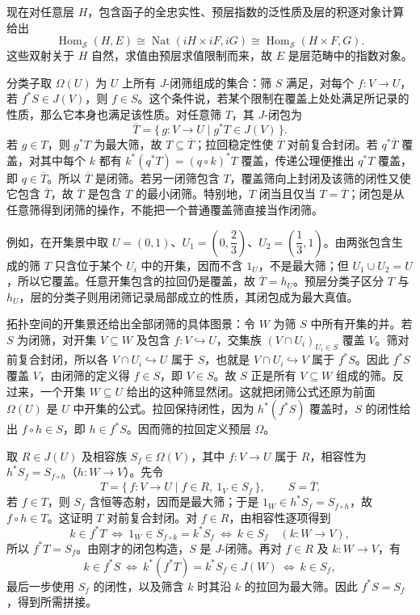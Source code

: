 \begin{proofsketch}
	现在对任意层 \(H\)，包含函子的全忠实性、预层指数的泛性质及层的积逐对象计算给出
	\[
		\operatorname{Hom}_{\mathcal S}(H,E) \cong\operatorname{Nat}(iH\times iF,iG) \cong\operatorname{Hom}_{\mathcal S}(H\times F,G).
	\]
	这些双射关于 \(H\) 自然，求值由预层求值限制而来，故 \(E\) 是层范畴中的指数对象。

	分类子取 \(\Omega(U)\) 为 \(U\) 上所有 \(J\)-闭筛组成的集合：筛 \(S\) 满足，对每个 \(f:V\to U\)，若 \(f^*S\in J(V)\)，则 \(f\in S\)。这个条件说，若某个限制在覆盖上处处满足所记录的性质，那么它本身也满足该性质。对任意筛 \(T\)，其 \(J\)-闭包为
	\[
		\overline T=\{\,g:V\to U\mid g^*T\in J(V)\,\}.
	\]
	若 \(g\in T\)，则 \(g^*T\) 为最大筛，故 \(T\subseteq\overline T\)；拉回稳定性使 \(\overline T\) 对前复合封闭。若 \(q^*\overline T\) 覆盖，对其中每个 \(k\) 都有 \(k^*(q^*T)=(q\circ k)^*T\) 覆盖，传递公理便推出 \(q^*T\) 覆盖，即 \(q\in\overline T\)。所以 \(\overline T\) 是闭筛。若另一闭筛包含 \(T\)，覆盖筛向上封闭及该筛的闭性又使它包含 \(\overline T\)，故 \(\overline T\) 是包含 \(T\) 的最小闭筛。特别地，\(T\) 闭当且仅当 \(T=\overline T\)；闭包是从任意筛得到闭筛的操作，不能把一个普通覆盖筛直接当作闭筛。

	例如，在开集景中取 \(U=(0,1)\)、\(U_1=(0,\dfrac23)\)、\(U_2=(\dfrac13,1)\)。由两张包含生成的筛 \(T\) 只含位于某个 \(U_i\) 中的开集，因而不含 \(1_U\)，不是最大筛；但 \(U_1\cup U_2=U\)，所以它覆盖。任意开集包含的拉回仍是覆盖，故 \(\overline T=h_U\)。预层分类子区分 \(T\) 与 \(h_U\)，层的分类子则用闭筛记录局部成立的性质，其闭包成为最大真值。

	拓扑空间的开集景还给出全部闭筛的具体图景：令 \(W\) 为筛 \(S\) 中所有开集的并。若 \(S\) 为闭筛，对开集 \(V\subseteq W\) 及包含 \(f:V\hookrightarrow U\)，交集族 \((V\cap U_i)_{U_i\in S}\) 覆盖 \(V\)。筛对前复合封闭，所以各 \(V\cap U_i\hookrightarrow U\) 属于 \(S\)，也就是 \(V\cap U_i\hookrightarrow V\) 属于 \(f^*S\)。因此 \(f^*S\) 覆盖 \(V\)，由闭筛的定义得 \(f\in S\)，即 \(V\in S\)。故 \(S\) 正是所有 \(V\subseteq W\) 组成的筛。反过来，一个开集 \(W\subseteq U\) 给出的这种筛显然闭。这就把闭筛公式还原为前面 \(\Omega(U)\) 是 \(U\) 中开集的公式。拉回保持闭性，因为 \(h^*(f^*S)\) 覆盖时，\(S\) 的闭性给出 \(f\circ h\in S\)，即 \(h\in f^*S\)。因而筛的拉回定义预层 \(\Omega\)。

	取 \(R\in J(U)\) 及相容族 \(S_f\in\Omega(V)\)，其中 \(f:V\to U\) 属于 \(R\)，相容性为 \(h^*S_f=S_{f\circ h}\)（\(h:W\to V\)）。先令
	\[
		T=\{\,f:V\to U\mid f\in R,\ 1_V\in S_f\,\}, \qquad S=\overline T.
	\]
	若 \(f\in T\)，则 \(S_f\) 含恒等态射，因而是最大筛；于是 \(1_W\in h^*S_f=S_{f\circ h}\)，故 \(f\circ h\in T\)。这证明 \(T\) 对前复合封闭。对 \(f\in R\)，由相容性逐项得到
	\[
		k\in f^*T \ \Longleftrightarrow\ 1_W\in S_{f\circ k}=k^*S_f \ \Longleftrightarrow\ k\in S_f \quad(k:W\to V),
	\]
	所以 \(f^*T=S_f\)。由刚才的闭包构造，\(S\) 是 \(J\)-闭筛。再对 \(f\in R\) 及 \(k:W\to V\)，有
	\[
		k\in f^*S \ \Longleftrightarrow\ k^*(f^*T)=k^*S_f\in J(W) \ \Longleftrightarrow\ k\in S_f,
	\]
	最后一步使用 \(S_f\) 的闭性，以及筛含 \(k\) 时其沿 \(k\) 的拉回为最大筛。因此 \(f^*S=S_f\)，得到所需拼接。


\end{proofsketch}
